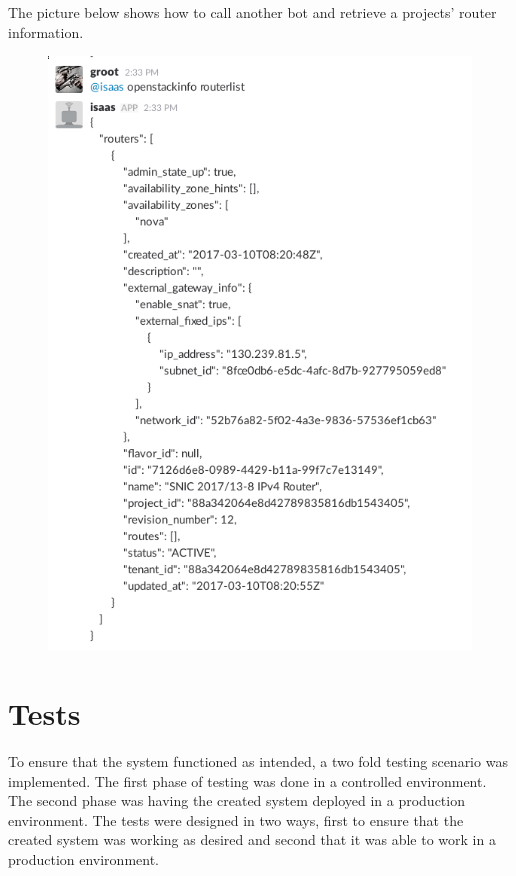\documentclass[12pt]{article}
\begin{document}
\newpage
The picture below shows how to call another bot and retrieve a projects' router information.
\begin{figure}[H]
    \begin{mdframed}
    \includegraphics[scale=.5]{./pic/2017-06-26-113808_563x789_scrot.png}
    \end{mdframed}
\end{figure}

\section{Tests}
To ensure that the system functioned as intended, a two fold testing scenario was implemented. The first phase of testing was done in a controlled environment. The second phase was having the created system deployed in a production environment. The tests were designed in two ways, first to ensure that the created system was working as desired and second that it was able to work in a production environment.
\end{document}
